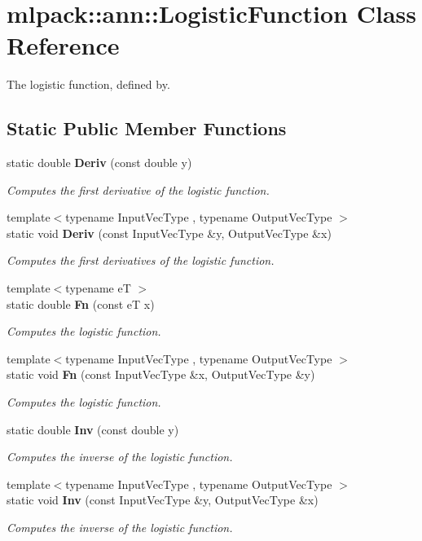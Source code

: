 \section{mlpack\+:\+:ann\+:\+:Logistic\+Function Class Reference}
\label{classmlpack_1_1ann_1_1LogisticFunction}


The logistic function, defined by.  


\subsection*{Static Public Member Functions}
\begin{DoxyCompactItemize}
\item 
static double {\bf Deriv} (const double y)
\begin{DoxyCompactList}\small\item\em Computes the first derivative of the logistic function. \end{DoxyCompactList}\item 
{\footnotesize template$<$typename Input\+Vec\+Type , typename Output\+Vec\+Type $>$ }\\static void {\bf Deriv} (const Input\+Vec\+Type \&y, Output\+Vec\+Type \&x)
\begin{DoxyCompactList}\small\item\em Computes the first derivatives of the logistic function. \end{DoxyCompactList}\item 
{\footnotesize template$<$typename eT $>$ }\\static double {\bf Fn} (const eT x)
\begin{DoxyCompactList}\small\item\em Computes the logistic function. \end{DoxyCompactList}\item 
{\footnotesize template$<$typename Input\+Vec\+Type , typename Output\+Vec\+Type $>$ }\\static void {\bf Fn} (const Input\+Vec\+Type \&x, Output\+Vec\+Type \&y)
\begin{DoxyCompactList}\small\item\em Computes the logistic function. \end{DoxyCompactList}\item 
static double {\bf Inv} (const double y)
\begin{DoxyCompactList}\small\item\em Computes the inverse of the logistic function. \end{DoxyCompactList}\item 
{\footnotesize template$<$typename Input\+Vec\+Type , typename Output\+Vec\+Type $>$ }\\static void {\bf Inv} (const Input\+Vec\+Type \&y, Output\+Vec\+Type \&x)
\begin{DoxyCompactList}\small\item\em Computes the inverse of the logistic function. \end{DoxyCompactList}\end{DoxyCompactItemize}



